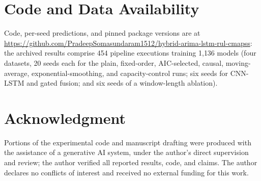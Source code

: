 \documentclass[conference]{IEEEtran}
\newif\ifblind\blindfalse
\begin{document}
\section*{Code and Data Availability}
Code, per-seed predictions, and pinned package versions are at \ifblind [repository URL withheld for blind review]\else\url{https://github.com/PradeepSomasundaram1512/hybrid-arima-lstm-rul-cmapss}\fi: the archived results comprise 454 pipeline executions training 1{,}136 models (four datasets, 20 seeds each for the plain, fixed-order, AIC-selected, causal, moving-average, exponential-smoothing, and capacity-control runs; six seeds for CNN-LSTM and gated fusion; and six seeds of a window-length ablation).

\section*{Acknowledgment}
Portions of the experimental code and manuscript drafting were produced with the assistance of a generative AI system, under the author's direct supervision and review; the author verified all reported results, code, and claims. The author declares no conflicts of interest and received no external funding for this work.
\end{document}
